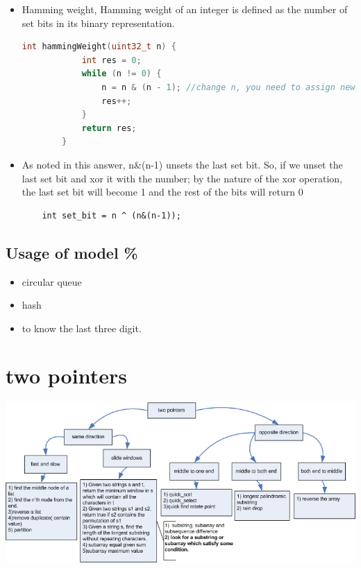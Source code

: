 \documentclass[a4paper,11pt,twoside]{book}
\begin{document}
\begin{itemize}
	\item Hamming weight,  Hamming weight of an integer is defined as the number of set bits in its binary representation. 
	\begin{lstlisting}[frame=single, language=c++]	
		int hammingWeight(uint32_t n) {
			int res = 0;
			while (n != 0) {
				n = n & (n - 1); //change n, you need to assign new value back to n. 
				res++;
			}
			return res;
		}
	\end{lstlisting}

	\item As noted in this answer, n\&(n-1) unsets the last set bit.
So, if we unset the last set bit and xor it with the number; by the nature of the xor operation, the last set bit will become 1 and the rest of the bits will return 0
\begin{lstlisting}
	int set_bit = n ^ (n&(n-1));
\end{lstlisting}


\end{itemize}

\subsection{Usage of model \%}

\begin{itemize}
\item circular queue
\item hash
\item to know the last three digit. 
\end{itemize}

\section{two pointers}

\includegraphics[scale=0.6]{pics/two_pointers.png} \newline
\end{document}
